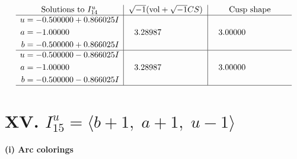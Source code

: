 \documentclass[1p]{elsarticle_modified}
\theoremstyle{definition}
\newcommand{\I}{\sqrt{-1}}
\begin{document}
$$\begin{array}{c|c|c}  
\text{Solutions to }I^u_{14}& \I (\text{vol} + \sqrt{-1}CS) & \text{Cusp shape}\\
 \hline 
\begin{aligned}
u &= -0.500000 + 0.866025 I \\
a &= -1.00000\phantom{ +0.000000I} \\
b &= -0.500000 + 0.866025 I\end{aligned}
 & \phantom{-}3.28987\phantom{ +0.000000I} & \phantom{-}3.00000\phantom{ +0.000000I} \\ \hline\begin{aligned}
u &= -0.500000 - 0.866025 I \\
a &= -1.00000\phantom{ +0.000000I} \\
b &= -0.500000 - 0.866025 I\end{aligned}
 & \phantom{-}3.28987\phantom{ +0.000000I} & \phantom{-}3.00000\phantom{ +0.000000I}\\
 \hline 
 \end{array}$$\newpage\newpage\renewcommand{\arraystretch}{1}
\centering \section*{XV. $I^u_{15}= \langle b+1,\;a+1,\;u-1 \rangle$}
\flushleft \textbf{(i) Arc colorings}\\
\end{document}
